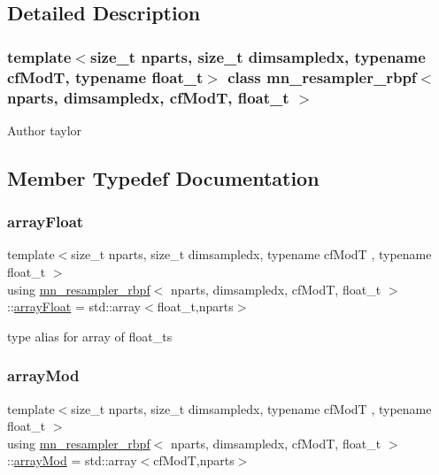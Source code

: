 \subsection{Detailed Description}
\subsubsection*{template$<$size\+\_\+t nparts, size\+\_\+t dimsampledx, typename cf\+ModT, typename float\+\_\+t$>$\newline
class mn\+\_\+resampler\+\_\+rbpf$<$ nparts, dimsampledx, cf\+Mod\+T, float\+\_\+t $>$}

\begin{DoxyAuthor}{Author}
taylor 
\end{DoxyAuthor}


\subsection{Member Typedef Documentation}
\mbox{\label{classmn__resampler__rbpf_a43fa641c6d15c8ee79da47d6af02ac16}} 
\subsubsection{\texorpdfstring{array\+Float}{arrayFloat}}
{\footnotesize\ttfamily template$<$size\+\_\+t nparts, size\+\_\+t dimsampledx, typename cf\+ModT , typename float\+\_\+t $>$ \\
using \hyperlink{classmn__resampler__rbpf}{mn\+\_\+resampler\+\_\+rbpf}$<$ nparts, dimsampledx, cf\+ModT, float\+\_\+t $>$\+::\hyperlink{classmn__resampler__rbpf_a43fa641c6d15c8ee79da47d6af02ac16}{array\+Float} =  std\+::array$<$float\+\_\+t,nparts$>$}

type alias for array of float\+\_\+ts \mbox{\label{classmn__resampler__rbpf_a268fe176a23e146b8f0c1acbaf8625b3}} 
\subsubsection{\texorpdfstring{array\+Mod}{arrayMod}}
{\footnotesize\ttfamily template$<$size\+\_\+t nparts, size\+\_\+t dimsampledx, typename cf\+ModT , typename float\+\_\+t $>$ \\
using \hyperlink{classmn__resampler__rbpf}{mn\+\_\+resampler\+\_\+rbpf}$<$ nparts, dimsampledx, cf\+ModT, float\+\_\+t $>$\+::\hyperlink{classmn__resampler__rbpf_a268fe176a23e146b8f0c1acbaf8625b3}{array\+Mod} =  std\+::array$<$cf\+ModT,nparts$>$}

